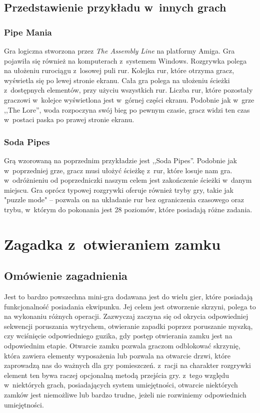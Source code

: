 \documentclass[oneside,polski,logo]{amuthesis}
\begin{document}
\subsection{Przedstawienie przykładu w~innych grach}
\subsubsection{Pipe Mania}
\par Gra logiczna stworzona przez \emph{The Assembly Line} na platformy Amiga. Gra pojawiła się również na komputerach z~systemem Windows. Rozgrywka polega na ułożeniu rurociągu z~losowej puli rur. Kolejka rur, które otrzyma gracz, wyświetla się po lewej stronie ekranu. Cała gra polega na ułożeniu ścieżki z~dostępnych elementów, przy użyciu wszystkich rur. Liczba rur, które pozostały graczowi w~kolejce wyświetlona jest w~górnej części ekranu. Podobnie jak w~grze ,,The Lore'', woda rozpoczyna swój bieg po pewnym czasie, gracz widzi ten czas w~postaci paska po prawej stronie ekranu. \cite{pipemania}

\subsubsection{Soda Pipes}
\par Grą wzorowaną na poprzednim przykładzie jest ,,Soda Pipes''. Podobnie jak w~poprzedniej grze, gracz musi ułożyć ścieżkę z~rur, które losuje nam gra. w~odróżnieniu od poprzedniczki naszym celem jest zakończenie ścieżki w~danym miejscu. Gra oprócz typowej rozgrywki oferuje również tryby gry, takie jak "puzzle mode" – pozwala on na układanie rur bez ograniczenia czasowego oraz trybu, w~którym do pokonania jest 28 poziomów, które posiadają różne zadania. \cite{sp}

\section{Zagadka z~otwieraniem zamku}
\subsection{Omówienie zagadnienia}
\par Jest to bardzo powszechna mini-gra dodawana jest do wielu gier, które posiadają funkcjonalność posiadania ekwipunku. Jej celem jest otworzenie skrzyni, polega to na wykonaniu różnych operacji. Zazwyczaj zaczyna się od okrycia odpowiedniej sekwencji poruszania wytrychem, otwieranie zapadki poprzez poruszanie myszką, czy wciśnięcie odpowiedniego guzika, gdy postęp otwierania zamku jest na odpowiednim etapie. Otwarcie zamku pozwala graczom odblokować skrzynię, która zawiera elementy wyposażenia lub pozwala na otwarcie drzwi, które zaprowadzą nas do ważnych dla gry pomieszczeń. z~racji na charakter rozgrywki element ten bywa raczej opcjonalną metodą przejścia gry. z~tego względu w~niektórych grach, posiadających system umiejętności, otwarcie niektórych zamków jest niemożliwe lub bardzo trudne, jeżeli nie rozwiniemy odpowiednich umiejętności.
\end{document}
